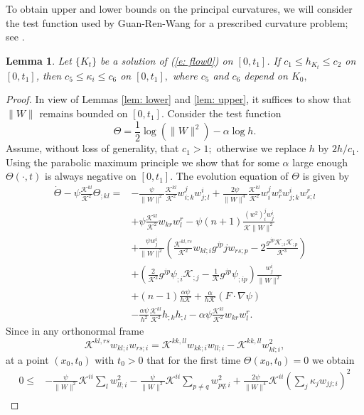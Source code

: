 \documentclass{amsart}
\newtheorem{lemma}[theorem]{Lemma}
\theoremstyle{definition}
\theoremstyle{remark}
\numberwithin{equation}{section}
\begin{document}
 To obtain upper and lower bounds on the principal curvatures, we will consider the test function used by Guan-Ren-Wang for a prescribed curvature problem; see \cite[(4.2)]{Guan}.
\begin{lemma}\label{lem: final}
Let $\{K_t\}$ be a solution of (\ref{e: flow0}) on $[0,t_1]$. If $c_1\leq h_{K_t}\leq c_2$ on $[0,t_1]$, then $c_5\leq \kappa_i\le c_6$ on $[0,t_1],$ where $c_5$ and $c_6$ depend on $K_0,$
\end{lemma}
\begin{proof}
In view of Lemmas \ref{lem: lower} and \ref{lem: upper}, it suffices to show that $\|W\|$ remains bounded on $[0,t_1]$. Consider the test function
\[\Theta=\frac 12\log(\|W\|^2)-\alpha\log h.\]
Assume, without loss of generality, that $c_1> 1;$ otherwise we replace $h$ by $2h/c_1.$
Using the parabolic maximum principle we show that for some $\alpha$ large enough $\Theta(\cdot,t)$ is always negative on $[0,t_1]$. The evolution equation of $\Theta$
is given by
\begin{align*}
\dot{\Theta}-\psi\frac{\mathcal{K}^{kl}}{\mathcal{K}^2}\Theta_{;kl} =& -\frac{\psi}{\|W\|^2} \frac{\mathcal{K}^{kl}}{\mathcal{K}^2} w_{i;k}^j w_{j;l}^i + \frac{2\psi}{\|W\|^4} \frac{\mathcal{K}^{kl}}{\mathcal{K}^2} w^j_iw^s_r w^i_{j;k} w^r_{s;l} \\
&+ \psi \frac{\mathcal{K}^{kl}}{\mathcal{K}^2} w_{kr}w_l^r - \psi(n+1) \frac{(w^2)_i^jw_j^i}{\mathcal{K}\|W\|^2} \\
&+ \frac{\psi w^i_j}{\|W\|^2} \left(\frac{\mathcal{K}^{kl,rs}}{\mathcal{K}^2} w_{kl;i} g^{jp}jw_{rs;p} - 2\frac{g^{jp} \mathcal{K}_{;i}\mathcal{K}_{;p}}{\mathcal{K}^3}\right) \\
&+ \left(\frac{2}{\mathcal{K}^2} g^{jp}\psi_{;i} \mathcal{K}_{;j} - \frac{1}{\mathcal{K}} g^{jp} \psi_{;ip}\right) \frac{w^i_j}{\|W\|^2} \\
& +(n-1) \frac{\alpha\psi}{h\mathcal{K}} + \frac{\alpha}{h\mathcal{K}} (F\cdot\nabla\psi) \\
&- \frac{\alpha\psi}{h^2} \frac{\mathcal{K}^{kl}}{\mathcal{K}^2} h_{;k}h_{;l} - \alpha\psi \frac{\mathcal{K}^{kl}}{\mathcal{K}^2} w_{kr}w_l^r.
\end{align*}
Since in any orthonormal frame $$\mathcal{K}^{kl,rs}w_{kl;i}w_{rs;i}=\mathcal{K}^{kk,ll}w_{kk;i}w_{ll;i}-\mathcal{K}^{kk,ll}w_{kl;i}^2,$$ at a point $(x_0,t_0)$ with $t_0>0$ that for the first time $\Theta(x_0,t_0)=0$ we obtain
\begin{align*}
0 \leq& -\frac{\psi}{\|W\|^2} \mathcal{K}^{ii} \sum_lw_{ll;i}^2 - \frac{\psi}{\|W\|^2} \mathcal{K}^{ii} \sum_{p\ne q}w_{pq;i}^2 + \frac{2\psi}{\|W\|^4} \mathcal{K}^{ii} \left(\sum_j\kappa_jw_{jj;i}\right)^2 \\

\end{align*}
\end{proof}
\end{document}
